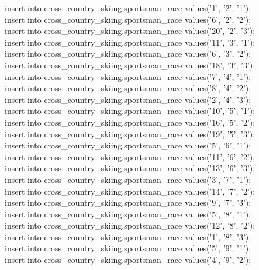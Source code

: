 \documentclass[a4paper,12pt]{article}
\begin{document}
insert into cross\_country\_skiing.sportsman\_race values('1',  '2', '1');\\
insert into cross\_country\_skiing.sportsman\_race values('6',  '2', '2');\\
insert into cross\_country\_skiing.sportsman\_race values('20', '2', '3');\\
insert into cross\_country\_skiing.sportsman\_race values('11', '3', '1');\\
insert into cross\_country\_skiing.sportsman\_race values('6',  '3', '2');\\
insert into cross\_country\_skiing.sportsman\_race values('18', '3', '3');\\
insert into cross\_country\_skiing.sportsman\_race values('7',  '4', '1');\\
insert into cross\_country\_skiing.sportsman\_race values('8',  '4', '2');\\
insert into cross\_country\_skiing.sportsman\_race values('2',  '4', '3');\\
insert into cross\_country\_skiing.sportsman\_race values('10', '5', '1');\\
insert into cross\_country\_skiing.sportsman\_race values('16', '5', '2');\\
insert into cross\_country\_skiing.sportsman\_race values('19', '5', '3');\\
insert into cross\_country\_skiing.sportsman\_race values('5',  '6', '1');\\
insert into cross\_country\_skiing.sportsman\_race values('11', '6', '2');\\
insert into cross\_country\_skiing.sportsman\_race values('13', '6', '3');\\
insert into cross\_country\_skiing.sportsman\_race values('3',  '7', '1');\\
insert into cross\_country\_skiing.sportsman\_race values('14', '7', '2');\\
insert into cross\_country\_skiing.sportsman\_race values('9',  '7', '3');\\
insert into cross\_country\_skiing.sportsman\_race values('5',  '8', '1');\\
insert into cross\_country\_skiing.sportsman\_race values('12', '8', '2');\\
insert into cross\_country\_skiing.sportsman\_race values('1',  '8', '3');\\
insert into cross\_country\_skiing.sportsman\_race values('5',  '9', '1');\\
insert into cross\_country\_skiing.sportsman\_race values('4',  '9', '2');\\
\end{document}
